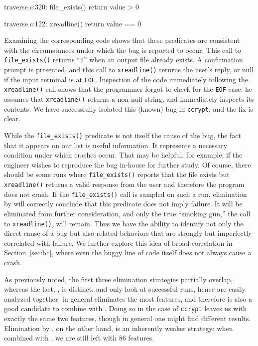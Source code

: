 \begin{features}
\item traverse.c:320: file\_exists() return value > 0
\item traverse.c:122: xreadline() return value == 0
\end{features}

Examining the corresponding code shows that these predicates are
consistent with the circumstances under which the bug is reported to
occur.  This call to \texttt{file\_exists()} returns ``{\tt 1}'' when an output
file already exists.  A confirmation prompt is presented, and this
call to \texttt{xreadline()} returns the user's reply, or null if the
input terminal is at \texttt{EOF}.  Inspection of the code immediately
following the \texttt{xreadline()} call shows that the programmer
forgot to check for the \texttt{EOF} case: he assumes that
\texttt{xreadline()} returns a non-null string, and immediately
inspects its contents.  We have successfully isolated this (known) bug
in \texttt{ccrypt}, and the fix is clear.

While the \texttt{file\_exists()} predicate is not itself the cause of
the bug, the fact that it appears on our list is useful information.
It represents a necessary condition under which crashes occur.  That
may be helpful, for example, if the engineer wishes to reproduce the
bug in-house for further study.  Of course, there should be some runs
where \texttt{file\_exists()} reports that the file exists but
\texttt{xreadline()} returns a valid response from the user and
therefore the program does not crash.  If the \texttt{file\_exists()}
call is sampled on such a run, elimination by  will correctly conclude that this predicate does not
imply failure.  It will be eliminated from further consideration, and
only the true ``smoking gun,'' the call to \texttt{xreadline()}, will
remain.  Thus we have the ability to identify not only the direct
cause of a bug but also related behaviors that are strongly but
imperfectly correlated with failure.  We further explore this idea of
broad correlation in Section~\ref{sec:bc}, where even the buggy line
of code itself does not always cause a crash.

As previously noted, the first three elimination strategies partially
overlap, whereas the last, , is
distinct.   and  only look at successful runs, hence are easily
analyzed together.   in general
eliminates the most features, and therefore is also a good candidate
to combine with .  Doing so in the
case of \texttt{ccrypt} leaves us with exactly the same two features,
though in general one might find different results.  Elimination by
, on the other hand, is an inherently
weaker strategy; when combined with ,
we are still left with 86 features.

